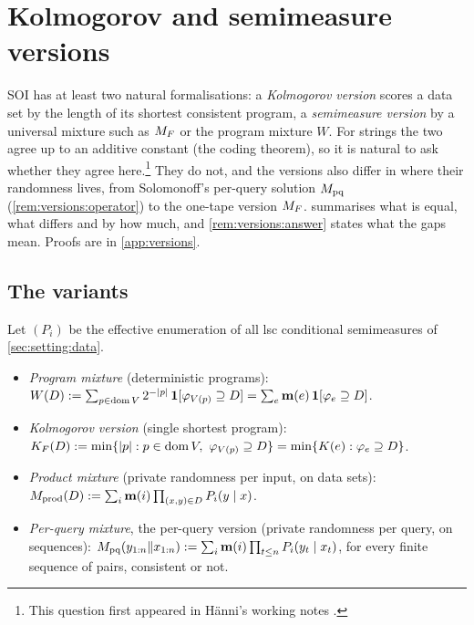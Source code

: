 \section{Kolmogorov and semimeasure versions}\label{sec:versions}

SOI has at least two natural formalisations: a \emph{Kolmogorov version} scores a data set by the length of its shortest consistent program, a \emph{semimeasure version} by a universal mixture such as $M_{F}$ or the program mixture $W$. For strings the two agree up to an additive constant (the coding theorem), so it is natural to ask whether they agree here.\footnote{This question first appeared in H\"anni's working notes \citep{hanni2026notes}.} They do not, and the versions also differ in where their randomness lives, from Solomonoff's per-query solution $M_{\mathrm{pq}}$ (\cref{rem:versions:operator}) to the one-tape version $M_{F}$.  summarises what is equal, what differs and by how much, and \cref{rem:versions:answer} states what the gaps mean. Proofs are in \cref{app:versions}.

\subsection{The variants}\label{sec:versions:defs}

\begin{definition}[Variants]\label{def:versions:variants}
Let $(P_i)$ be the effective enumeration of all lsc conditional semimeasures of \cref{sec:setting:data}.
\begin{itemize}
\item \emph{Program mixture} (deterministic programs):\\ $W(D):=\sum_{p\in\operatorname{dom} V}2^{-|p|}\,\mathbf{1}[\varphi_{V(p)}\supseteq D]=\sum_e\mathbf{m}(e)\,\mathbf{1}[\varphi_e\supseteq D]$.
\item \emph{Kolmogorov version} (single shortest program): $\KF(D):=\min\{|p|:p\in\dom V,\ \varphi_{V(p)}\supseteq D\}=\min\{K(e):\varphi_e\supseteq D\}$.
\item \emph{Product mixture} (private randomness per input, on data sets):\\ $M_{\mathrm{prod}}(D):=\sum_i\mathbf{m}(i)\prod_{(x,y)\in D}P_i(y\mid x)$.
\item \emph{Per-query mixture}, the per-query version (private randomness per query, on sequences): $M_{\mathrm{pq}}(y_{1:n}\Vert x_{1:n}):=\sum_i\mathbf{m}(i)\prod_{t\le n}P_i(y_t\mid x_t)$, for every finite sequence of pairs, consistent or not.
\end{itemize}
\end{definition}

